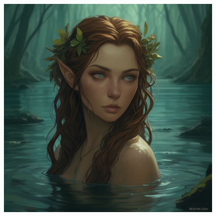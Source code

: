 
\begin{figure}[h]
\begin{center}
\includegraphics[scale=0.24]{img/ai-images/naiad.png}
\end{center}
\end{figure}
